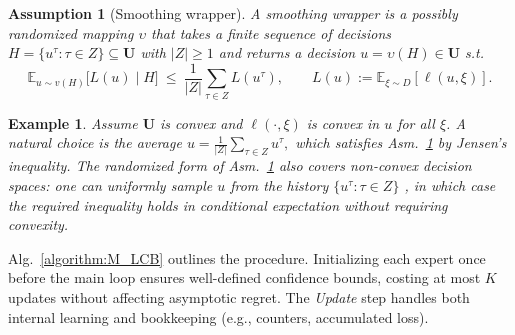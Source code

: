 \documentclass[a4paper,14pt]{extarticle}
\theoremstyle{plain}
\newtheorem{assumption}{Assumption}
\newtheorem{example}{Example}
\begin{document}
\begin{assumption}[Smoothing wrapper]
\label{assumption:wrapper}
A smoothing wrapper is a possibly randomized mapping $\upsilon$ that takes a finite sequence of decisions
$H=\{u^\tau:\tau\in Z\}\subseteq \mathbf U$ with $|Z|\ge 1$ and returns a decision $u=\upsilon(H)\in\mathbf U$
s.t.
\begin{equation*}
\mathbb E_{u\sim v(H)}\bigl[L(u)\mid H\bigr]\ \le\ \frac{1}{|Z|}\sum_{\tau\in Z} L(u^\tau),
\qquad
L(u):=\mathbb E_{\xi\sim D}[\ell(u,\xi)].
\end{equation*}
\end{assumption}

\begin{example}
\label{example:wrapper}
Assume $\mathbf U$ is convex and $\ell(\cdot,\xi)$ is convex in $u$ for all $\xi$. A natural choice is the average $u = \frac{1}{|Z|}\sum_{\tau\in Z} u^\tau,$
which satisfies Asm.~\ref{assumption:wrapper} by Jensen's inequality. The randomized form of Asm.~\ref{assumption:wrapper} also covers non-convex decision spaces: one can uniformly sample $u$ from the history $\{u^\tau:\tau\in Z\}$ \cite{pacchiano2020model}, in which case the required inequality holds in conditional expectation without requiring convexity.
\end{example}

Alg.~\ref{algorithm:M_LCB} outlines the procedure. Initializing each expert once before the main loop ensures well-defined confidence bounds, costing at most $K$ updates without affecting asymptotic regret. The \textit{Update} step handles both internal learning and bookkeeping (e.g., counters, accumulated loss).

\end{document}
